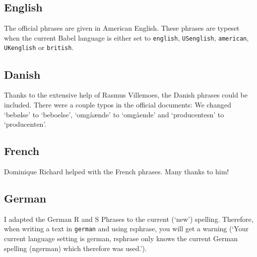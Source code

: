 \documentclass[a4paper,notitlepage,parskip=half]{scrreprt}
\begin{document}
{\begin{RandS}
      {}
      {}
  \end{RandS}
}

\subsection{English}
The official phrases are given in American English. These phrases are typeset when the current Babel language is either set to \verb|english|, \verb|USenglish|, \verb|american|, \verb|UKenglish| or \verb|british|.
\allrsphrases
{}

\subsection{Danish}
Thanks to the extensive help of Rasmus Villemoes, the Danish phrases could be included. There were a couple typos in the official documents: We changed `bebølse' to `beboelse', `omgåænde' to `omgående' and `producentesn' to `producenten'.
\allrsphrases
{}

\subsection{French}
Dominique Richard helped with the French phrases. Many thanks to him!
\allrsphrases
{}

\subsection{German}
I adapted the German R and S Phrases to the current (`new') spelling. Therefore, when writing a text in \verb|german| and using rsphrase, you will get a warning (`Your current language setting is german, rsphrase only knows the current German spelling (ngerman) which therefore was used.').
\allrsphrases
{}
\end{document}
